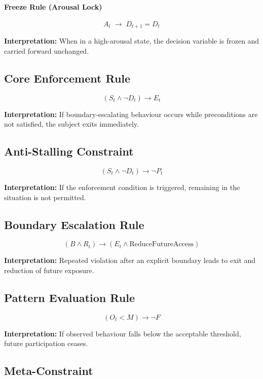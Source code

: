 \documentclass{article}
\begin{document}
	\paragraph{Freeze Rule (Arousal Lock)}
	\[
	A_t \;\rightarrow\; D_{t+1} = D_t
	\]
	
	\textbf{Interpretation:}  
	When in a high-arousal state, the decision variable is frozen and carried forward unchanged.
	
	\subsection*{Core Enforcement Rule}
	
	\[
	(S_t \land \neg D_t) \rightarrow E_t
	\]
	
	\textbf{Interpretation:}  
	If boundary-escalating behaviour occurs while preconditions are not satisfied, the subject exits immediately.
	
	\subsection*{Anti-Stalling Constraint}
	
	\[
	(S_t \land \neg D_t) \rightarrow \neg P_t
	\]
	
	\textbf{Interpretation:}  
	If the enforcement condition is triggered, remaining in the situation is not permitted.
	
	\subsection*{Boundary Escalation Rule}
	
	\[
	(B \land R_t) \rightarrow (E_t \land \text{ReduceFutureAccess})
	\]
	
	\textbf{Interpretation:}  
	Repeated violation after an explicit boundary leads to exit and reduction of future exposure.
	
	\subsection*{Pattern Evaluation Rule}
	
	\[
	(O_t < M) \rightarrow \neg F
	\]
	
	\textbf{Interpretation:}  
	If observed behaviour falls below the acceptable threshold, future participation ceases.
	
	\subsection*{Meta-Constraint}
	
\end{document}
